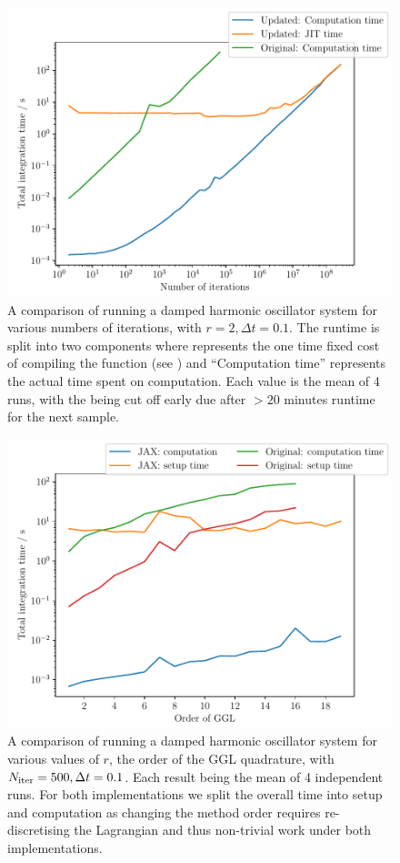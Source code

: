 \begin{figure}[t]
  \includegraphics[width=\columnwidth]{figures/dho_n_runtime.pdf}
  \caption{A comparison of running a damped harmonic oscillator system for various numbers of iterations, with $r = 2, \Delta t = 0.1$. The \updimpl{} runtime is split into two components where  represents the one time fixed cost of compiling the function (see ) and \enquote{Computation time} represents the actual time spent on computation.
  Each value is the mean of 4 runs, with the \orgimpl{} being cut off early due after $> 20$ minutes runtime for the next sample.}
  \label{fig:dho-n-runtime}
\end{figure}

\begin{figure}[t]
  \includegraphics[width=\columnwidth]{figures/dho_r_runtime.pdf}
  \caption{A comparison of running a damped harmonic oscillator system for various values of $r$, the order of the GGL quadrature, with $N_{\mathrm{iter}} = 500, \Delta t = 0.1$. Each result being the mean of 4 independent runs.
	For both implementations we split the overall time into setup and computation as changing the method order requires re-discretising the Lagrangian and thus non-trivial work under both implementations.}
  \label{fig:dho-r-runtime}
\end{figure}

